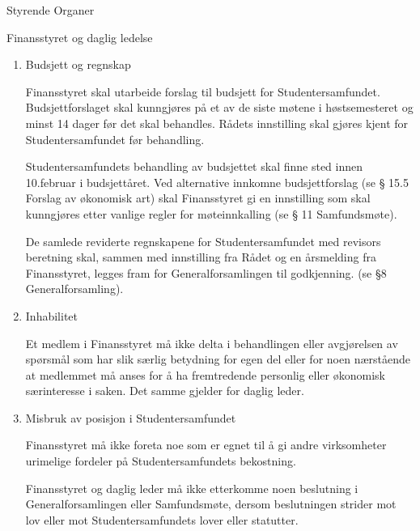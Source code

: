 \documentclass[fsbok.tex]{subfiles}
\begin{document}
\begin{lovkapittel}{Styrende Organer}
\begin{lovparagraf}{Finansstyret og daglig ledelse}
\begin{enumerate}
    Daglig leder har rett og plikt til å delta i Finansstyrets behandling av saker og til å uttale seg, med mindre
    annet er bestemt av Finansstyret i den enkelte sak.
    
    I ekstraordinære tilfeller kan saker behandles uten møte dersom samtlige medlemmer av Finansstyret godtar
    dette. Finansstyret kan ikke fatte noe vedtak dersom ikke alle medlemmene har fått anledning til å ta del i
    saksbehandlingen.
    
    Årsregnskap og årsberetning skal behandles i møte.
    
    \item Budsjett og regnskap
    
    Finansstyret skal utarbeide forslag til budsjett for Studentersamfundet. Budsjettforslaget skal kunngjøres på
    et av de siste møtene i høstsemesteret og minst 14 dager før det skal behandles. Rådets innstilling skal gjøres
    kjent for Studentersamfundet før behandling.
    
    Studentersamfundets behandling av budsjettet skal finne sted innen 10.februar i budsjettåret. Ved alternative
    innkomne budsjettforslag (se § 15.5 Forslag av økonomisk art) skal Finansstyret gi en innstilling som skal
    kunngjøres etter vanlige regler for møteinnkalling (se § 11 Samfundsmøte).
    
    De samlede reviderte regnskapene for Studentersamfundet med revisors beretning skal, sammen med
    innstilling fra Rådet og en årsmelding fra Finansstyret, legges fram for Generalforsamlingen til godkjenning.
    (se §8 Generalforsamling).
    
    \item Inhabilitet
    
    Et medlem i Finansstyret må ikke delta i behandlingen eller avgjørelsen av spørsmål som har slik særlig
    betydning for egen del eller for noen nærstående at medlemmet må anses for å ha fremtredende personlig
    eller økonomisk særinteresse i saken. Det samme gjelder for daglig leder.
    
    \item Misbruk av posisjon i Studentersamfundet
    
    Finansstyret må ikke foreta noe som er egnet til å gi andre virksomheter urimelige fordeler på
    Studentersamfundets bekostning.
    
    Finansstyret og daglig leder må ikke etterkomme noen beslutning i Generalforsamlingen eller
    Samfundsmøte, dersom beslutningen strider mot lov eller mot Studentersamfundets lover eller statutter.
    

\end{enumerate}
\end{lovparagraf}
\end{lovkapittel}
\end{document}
